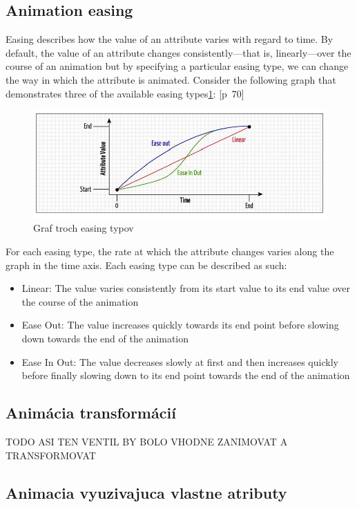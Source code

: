 \subsection{Animation easing}
Easing describes how the value of an attribute varies with regard to time. By default,
the value of an attribute changes consistently—that is, linearly—over the course of
an animation but by specifying a particular easing type, we can change the way in
which the attribute is animated. Consider the following graph that demonstrates
three of the available easing types\ref{fig:easing}:
\cite{Dawber}[p~70]

\begin{figure}[H]
\centering
\includegraphics[width=0.7\linewidth]{obrazky/easing}
\caption{Graf troch easing typov}
\label{fig:easing}
\end{figure}


For each easing type, the rate at which the attribute changes varies along the graph in
the time axis. Each easing type can be described as such:
\begin{itemize}
	

\item Linear: The value varies consistently from its start value to its end value over
the course of the animation
\item Ease Out: The value increases quickly towards its end point before slowing
down towards the end of the animation
\item Ease In Out: The value decreases slowly at first and then increases quickly
before finally slowing down to its end point towards the end of the animation
\end{itemize}




\subsection{Animácia transformácií}
TODO ASI TEN VENTIL BY BOLO VHODNE ZANIMOVAT A TRANSFORMOVAT

\subsection{Animacia vyuzivajuca vlastne atributy}

